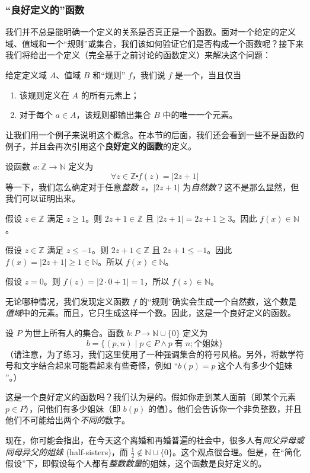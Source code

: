 \subsubsection*{``良好定义的''函数}

我们并不总是能明确一个定义的关系是否真正是一个函数。面对一个给定的定义域、值域和一个``规则''或集合，我们该如何验证它们是否构成一个函数呢？接下来我们将给出一个定义（完全基于之前讨论的函数定义）来解决这个问题：

\begin{definition}\label{def:definition7.2.5}
    给定定义域 $A$、值域 $B$ 和``规则'' $f$，我们说 $f$ 是一个，当且仅当
    \begin{enumerate}[label=(\arabic*)]
        \item 该规则定义在 $A$ 的所有元素上；
        \item 对于每个 $a \in A$，该规则都输出集合 $B$ 中的唯一一个元素。
    \end{enumerate}
\end{definition}

让我们用一个例子来说明这个概念。在本节的后面，我们还会看到一些不是函数的例子，并且会再次引用这个\textbf{良好定义的函数}的定义。\\

\begin{example}
    设函数 $a : \mathbb{Z} \to \mathbb{N}$ 定义为
    \[\forall z \in \mathbb{Z} \centerdot f(z) = |2z + 1|\]
    等一下，我们怎么确定对于任意\emph{整数} $z$，$|2z + 1|$ 为\emph{自然数}？这不是那么显然，但我们可以证明出来。

    假设 $z \in \mathbb{Z}$ 满足 $z \ge 1$。则 $2z+1 \in \mathbb{Z}$ 且 $|2z+1| = 2z+1 \ge 3$。因此 $f(x) \in \mathbb{N}$。

    假设 $z \in \mathbb{Z}$ 满足 $z \le -1$。则 $2z+1 \in \mathbb{Z}$ 且 $2z+1 \le -1$。因此 $f(x) = |2z + 1| ≥ 1 \in \mathbb{N}$。所以 $f(x) \in \mathbb{N}$。

    假设 $z = 0$。则 $f(z) = |2 \cdot 0 + 1| = 1$，所以 $f(z) \in \mathbb{N}$。

    无论哪种情况，我们发现定义函数 $f$ 的``规则''确实会生成一个自然数，这个数是\emph{值域}中的元素。而且，它只生成这样一个数。因此，这是一个良好定义的函数。
\end{example}

\begin{example}
    设 $P$ 为世上所有人的集合。函数 $b : P \to \mathbb{N} \cup \{0\}$ 定义为
    \[b = \{(p, n) \mid p \in P \land p \;\text{有}\; n ;\text{个姐妹}\}\]
    （请注意，为了练习，我们这里使用了一种强调集合的符号风格。另外，将数学符号和文字结合起来可能看起来有些奇怪，例如 ``$b(p) = p \;\text{这个人有多少个姐妹}$''。）

    这是一个良好定义的函数吗？我们认为是的。假如你走到某人面前（即某个元素 $p \in P$），问他们有多少姐妹（即 $b(p)$ 的值）。他们会告诉你一个非负整数，并且他们不可能给出两个\emph{不同的}数字。

    现在，你可能会指出，在今天这个离婚和再婚普遍的社会中，很多人有\emph{同父异母或同母异父的姐妹} (half-sisters)，而 $\frac{1}{2} \notin \mathbb{N} \cup \{0\}$。这个观点很合理。但是，在``简化假设''下，即假设每个人都有\emph{整数数量}的姐妹，这个函数是良好定义的。
\end{example}

